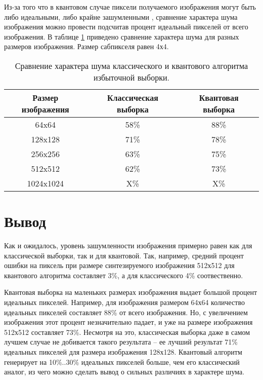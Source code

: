 Из-за того что в квантовом случае пиксели получаемого изображения могут быть либо идеальными, либо крайне зашумленными \cite{PQC-classic}, сравнение характера шума  изображения можно провести подсчитав процент идеальный пикселей от всего изображения. 
В таблице \ref{tab:noise_02} приведено сравнение характера шума для разных размеров изображения. Размер сабпикселя равен 4х4.

\begin{table}[h!]
	\label{tab:noise_02}
	\caption{Сравнение характера шума классического и квантового алгоритма избыточной выборки.}
	\begin{center}
		\begin{tabular}{|c| c | c|} 
			\hline
			Размер изображения & Классическая выборка & Квантовая выборка \\  
			\hline
			64x64 & 58\% & 88\%  \\
			\hline
			128x128 & 71\% & 78\% \\
			\hline
			256x256 & 63\% & 75\% \\
			\hline
			512x512 & 62\% & 73\% \\
			\hline
			1024x1024 & X\% & X\% \\
			\hline
		\end{tabular}
	\end{center}
\end{table}


\section*{Вывод}

Как и ожидалось, уровень зашумленности изображения примерно равен как для классической выборки, так и для квантовой. Так, например, средний процент ошибки на пиксель при размере синтезируемого изображения 512х512 для квантового алгоритма составляет 3\%, а для классического 4\% соотвественно.

Квантовая выборка на маленьких размерах изображения выдает большой процент идеальных пикселей. Например, для изображения размером 64х64 количество идеальных пикселей составляет 88\% от всего изображения. Но, с увеличением изображения этот процент незначительно падает, и уже на размере изображения 512х512 составляет 73\%. Несмотря на это, классическая выборка даже в самом лучшем случае не добивается такого результата -- ее лучший результат 71\% идеальных пикселей для размера изображения 128х128. Квантовый алгоритм генерирует на 10\%..30\% идеальных пикселей больше, чем его классический аналог, из чего можно сделать вывод о сильных различиях в характере шума.